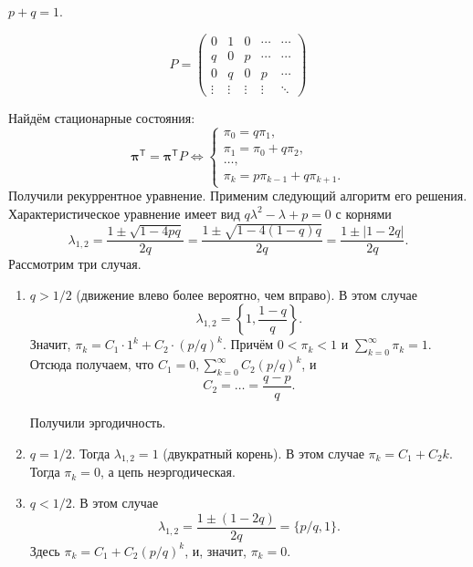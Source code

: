 \begin{ex}
  $p+q=1$.

  \[
    P = \begin{pmatrix}
      0 & 1 & 0 & \cdots & \cdots\\
      q & 0 & p & \cdots & \cdots\\
      0 & q & 0 & p & \cdots \\
      \vdots & \vdots & \vdots & \vdots & \ddots
    \end{pmatrix} 
  \]

  Найдём стационарные состояния:
  \[
    \bm\pi^{\mathsf T} = \bm\pi^{\mathsf T} P \Leftrightarrow
    \begin{cases}
      \pi_0 = q \pi_1, \\
      \pi_1 = \pi_0 + q \pi_2, \\
      \dots, \\
      \pi_k = p \pi_{k-1} + q \pi_{k+1}.
    \end{cases}
  \]
  Получили рекуррентное уравнение. Применим следующий алгоритм его решения.
  Характеристическое уравнение имеет вид $q \lambda^2 - \lambda + p = 0$ с
  корнями
  \[
    \lambda_{1, 2} = \dfrac{1\pm \sqrt{1-4pq}}{2q} = \dfrac{1 \pm \sqrt{1 - 4(1-q)q}}{2q}
    = \dfrac{1 \pm |1 - 2q|}{2q}.
  \]
  Рассмотрим три случая.
  \begin{enumerate}[label=\roman*)]
    \item $q > 1/2$ (движение влево более вероятно, чем вправо). В этом случае
      \[
        \lambda_{1, 2} = \left\{ 1, \frac{1-q}{q} \right\}.
      \]
      Значит, $\pi_k = C_1 \cdot 1^k + C_2 \cdot \left( p/q \right)^k$.
      Причём $0 < \pi_k < 1$ и $\sum\limits_{k=0}^\infty \pi_k = 1$.
      Отсюда получаем, что $C_1 = 0, \sum\limits_{k=0}^\infty C_2 \left( p/q
      \right)^k$,
      и $$C_2 = \ldots = \dfrac{q-p}{q}.$$

      Получили эргодичность.

    \item $q = 1/2$. Тогда $\lambda_{1,2} = 1$ (двукратный корень). В этом
      случае $\pi_k = C_1 + C_2 k$. 
      Тогда $\pi_k = 0$, а цепь неэргодическая.

    \item $q<1/2$. В этом случае
      \[
        \lambda_{1, 2} = \dfrac{1 \pm (1-2q)}{2q} = \{
          p/q,
          1
        \}.
      \]
      Здесь $\pi_k = C_1 + C_2 \left(p/q\right)^{k}$, и, значит, $\pi_k = 0$.
  \end{enumerate}
\end{ex}

